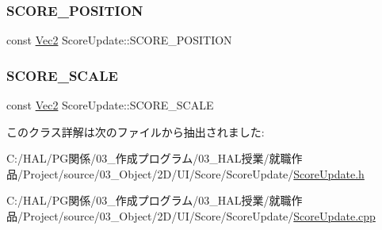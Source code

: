 \subsubsection{\texorpdfstring{S\+C\+O\+R\+E\+\_\+\+P\+O\+S\+I\+T\+I\+ON}{SCORE\_POSITION}}
{\footnotesize\ttfamily const \mbox{\hyperlink{_vector3_d_8h_a5ef6e95dfc5f9d3820b71772d99bbc25}{Vec2}} Score\+Update\+::\+S\+C\+O\+R\+E\+\_\+\+P\+O\+S\+I\+T\+I\+ON\hspace{0.3cm}{\ttfamily [static]}}

\mbox{\label{class_score_update_a23e9b8c4c6624cf5f3b66258771b3243}} 
\subsubsection{\texorpdfstring{S\+C\+O\+R\+E\+\_\+\+S\+C\+A\+LE}{SCORE\_SCALE}}
{\footnotesize\ttfamily const \mbox{\hyperlink{_vector3_d_8h_a5ef6e95dfc5f9d3820b71772d99bbc25}{Vec2}} Score\+Update\+::\+S\+C\+O\+R\+E\+\_\+\+S\+C\+A\+LE\hspace{0.3cm}{\ttfamily [static]}}



このクラス詳解は次のファイルから抽出されました\+:\begin{DoxyCompactItemize}
\item 
C\+:/\+H\+A\+L/\+P\+G関係/03\+\_\+作成プログラム/03\+\_\+\+H\+A\+L授業/就職作品/\+Project/source/03\+\_\+\+Object/2\+D/\+U\+I/\+Score/\+Score\+Update/\mbox{\hyperlink{_score_update_8h}{Score\+Update.\+h}}\item 
C\+:/\+H\+A\+L/\+P\+G関係/03\+\_\+作成プログラム/03\+\_\+\+H\+A\+L授業/就職作品/\+Project/source/03\+\_\+\+Object/2\+D/\+U\+I/\+Score/\+Score\+Update/\mbox{\hyperlink{_score_update_8cpp}{Score\+Update.\+cpp}}\end{DoxyCompactItemize}
